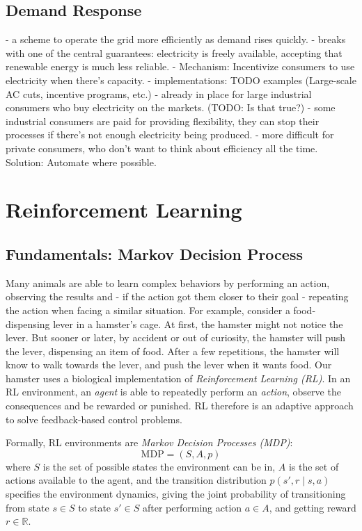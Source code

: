 \subsection{Demand Response}
- a scheme to operate the grid more efficiently as demand rises quickly.
- breaks with one of the central guarantees: electricity is freely available, accepting that renewable energy is much less reliable.
- Mechanism: Incentivize consumers to use electricity when there's capacity.
- implementations: TODO examples (Large-scale AC cuts, incentive programs, etc.)
- already in place for large industrial consumers who buy electricity on the markets. (TODO: Is that true?)
    - some industrial consumers are paid for providing flexibility, they can stop their processes if there's not enough electricity being produced.
- more difficult for private consumers, who don't want to think about efficiency all the time. Solution: Automate where possible.


\section{Reinforcement Learning}

\subsection{Fundamentals: Markov Decision Process}
Many animals are able to learn complex behaviors by performing an action, observing the results and - if the action got them closer to their goal - repeating the action when facing a similar situation.
For example, consider a food-dispensing lever in a hamster's cage. At first, the hamster might not notice the lever. But sooner or later, by accident or out of curiosity, the hamster will push the lever, dispensing an item of food. After a few repetitions, the hamster will know to walk towards the lever, and push the lever when it wants food.
Our hamster uses a biological implementation of \textit{Reinforcement Learning (RL)}.
In an RL environment, an \textit{agent} is able to repeatedly perform an \textit{action}, observe the consequences and be rewarded or punished.
RL therefore is an adaptive approach to solve feedback-based control problems.

Formally, RL environments are \textit{Markov Decision Processes (MDP)}:
$$ \text{MDP} = (S, A, p)$$
where $S$ is the set of possible states the environment can be in, $A$ is the set of actions available to the agent,
and the transition distribution $p(s', r \mid s, a)$ specifies the environment dynamics, giving the joint probability of transitioning from state $s \in S$ to state $s'\in S$ after performing action $a \in A$, and getting reward $r \in \mathbb{R}$.

